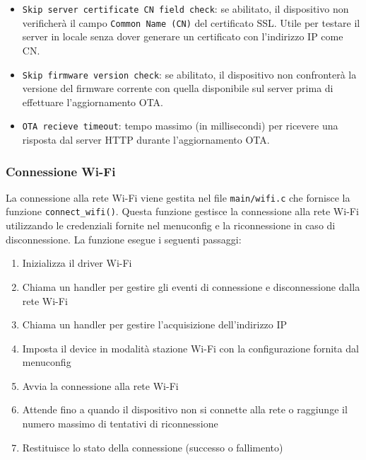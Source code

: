 \documentclass[a4paper]{article}
\begin{document}
\begin{itemize}
\begin{itemize}
\begin{itemize}
          \item \texttt{Skip server certificate CN field check}: se abilitato, il
            dispositivo non verificherà il campo \texttt{Common Name (CN)} del
            certificato SSL. Utile per testare il server in locale senza dover generare
            un certificato con l'indirizzo IP come CN.

          \item \texttt{Skip firmware version check}: se abilitato, il dispositivo non
            confronterà la versione del firmware corrente con quella disponibile sul
            server prima di effettuare l'aggiornamento OTA.

          \item \texttt{OTA recieve timeout}: tempo massimo (in millisecondi)
            per ricevere una risposta dal server HTTP durante l'aggiornamento OTA.
        \end{itemize}

    \end{itemize}
\end{itemize}

\subsubsection{Connessione Wi-Fi}
La connessione alla rete Wi-Fi viene gestita nel file \texttt{main/wifi.c} che
fornisce la funzione \texttt{connect\_wifi()}. Questa funzione gestisce la connessione
alla rete Wi-Fi utilizzando le credenziali fornite nel menuconfig e la riconnessione
in caso di disconnessione. La funzione esegue i seguenti passaggi:
\begin{enumerate}
  \item Inizializza il driver Wi-Fi
  \item Chiama un handler per gestire gli eventi di connessione e disconnessione 
    dalla rete Wi-Fi
  \item Chiama un handler per gestire l'acquisizione dell'indirizzo IP
  \item Imposta il device in modalità stazione Wi-Fi con la configurazione fornita
    dal menuconfig
  \item Avvia la connessione alla rete Wi-Fi
  \item Attende fino a quando il dispositivo non si connette alla rete o raggiunge
    il numero massimo di tentativi di riconnessione
  \item Restituisce lo stato della connessione (successo o fallimento)
\end{enumerate}
\end{document}
